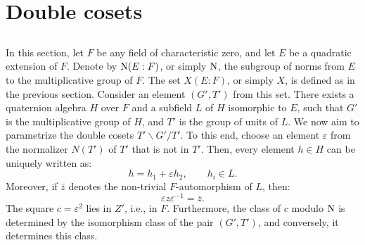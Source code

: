 \section{Double cosets}

\subsection{}

In this section, let $F$ be any field of characteristic zero, and let $E$ be a quadratic extension of $F$. Denote by $\mathrm{N}(E:F)$, or simply $\mathrm{N}$, the subgroup of norms from $E$ to the multiplicative group of $F$.
The set $X(E:F)$, or simply $X$, is defined as in the previous section.
Consider an element $(G', T')$ from this set.
There exists a quaternion algebra $H$ over $F$ and a subfield $L$ of $H$ isomorphic to $E$, such that $G'$ is the multiplicative group of $H$, and $T'$ is the group of units of $L$.
We now aim to parametrize the double cosets $T' \backslash G' / T'$.
To this end, choose an element $\varepsilon$ from the normalizer $N(T')$ of $T'$ that is not in $T'$.
Then, every element $h \in H$ can be uniquely written as:
\begin{equation}
    h = h_1 + \varepsilon h_2, \qquad h_i \in L.
\end{equation}
Moreover, if $\bar{z}$ denotes the non-trivial $F$-automorphism of $L$, then:
\begin{equation}
    \varepsilon z \varepsilon^{-1} = \bar{z}.
\end{equation} 
The square $c = \varepsilon^2$ lies in $Z'$, i.e., in $F$.
Furthermore, the class of $c$ modulo $\mathrm{N}$ is determined by the isomorphism class of the pair $(G', T')$, and conversely, it determines this class.

